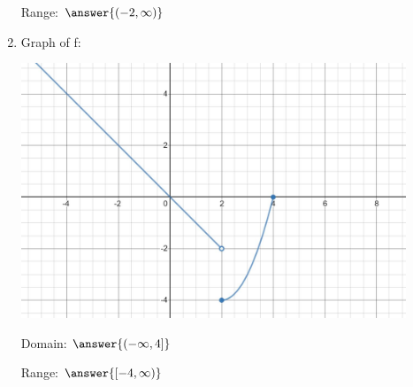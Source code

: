 \documentclass{ximera}
\begin{document}
\begin{problem}
\begin{enumerate}
 Range: $\answer{(-2,\infty)}$
 \item Graph of f:
     \begin{image}
   \includegraphics[height=3in]{160H2pic5.jpg}
 \end{image}
 
 Domain: $\answer{(-\infty,4]}$
 
 Range: $\answer{[-4,\infty)}$
\end{enumerate}
\end{problem}
\end{document}
